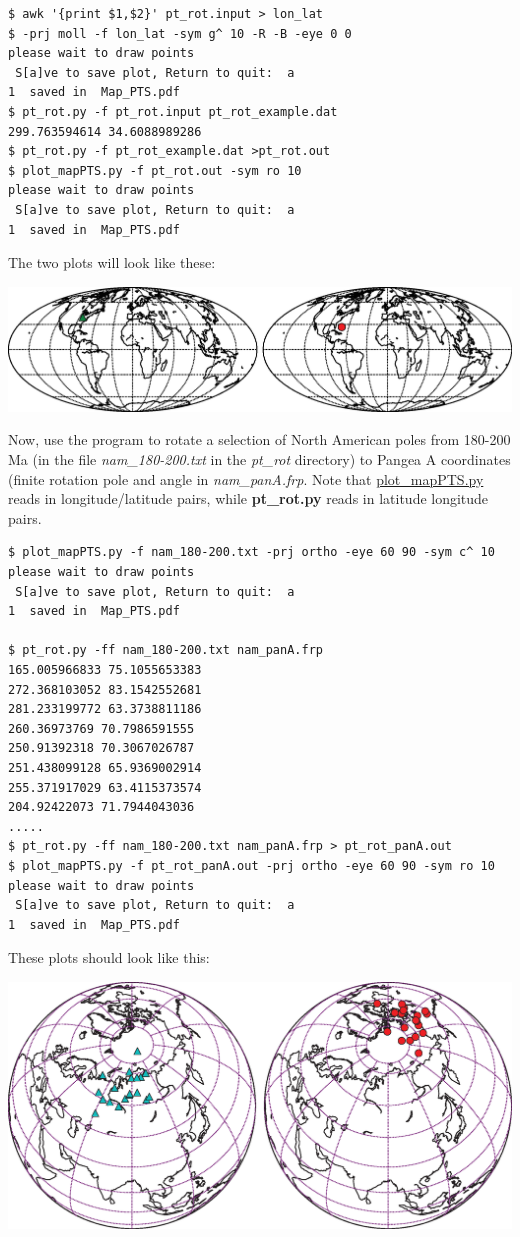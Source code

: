 \documentclass[11pt]{book}
\begin{document}
{{\begin{verbatim} 
$ awk '{print $1,$2}' pt_rot.input > lon_lat
$ -prj moll -f lon_lat -sym g^ 10 -R -B -eye 0 0
please wait to draw points
 S[a]ve to save plot, Return to quit:  a
1  saved in  Map_PTS.pdf
$ pt_rot.py -f pt_rot.input pt_rot_example.dat
299.763594614 34.6088989286
$ pt_rot.py -f pt_rot_example.dat >pt_rot.out
$ plot_mapPTS.py -f pt_rot.out -sym ro 10
please wait to draw points
 S[a]ve to save plot, Return to quit:  a
1  saved in  Map_PTS.pdf
\end{verbatim}

The two plots will look like these:

\includegraphics[width=15cm]{EPSfiles/pt_rot.eps}




Now, use the program to rotate a selection of North American poles from 180-200 Ma (in the file {\it nam\_180-200.txt} in the {\it pt\_rot} directory) to Pangea A coordinates (finite rotation pole and angle in {\it nam\_panA.frp}.   Note that \href{#plot_mapPTS.py}{plot\_mapPTS.py} reads in longitude/latitude pairs, while {\bf pt\_rot.py} reads in latitude longitude pairs.

\begin{verbatim}
$ plot_mapPTS.py -f nam_180-200.txt -prj ortho -eye 60 90 -sym c^ 10
please wait to draw points
 S[a]ve to save plot, Return to quit:  a
1  saved in  Map_PTS.pdf

$ pt_rot.py -ff nam_180-200.txt nam_panA.frp
165.005966833 75.1055653383
272.368103052 83.1542552681
281.233199772 63.3738811186
260.36973769 70.7986591555
250.91392318 70.3067026787
251.438099128 65.9369002914
255.371917029 63.4115373574
204.92422073 71.7944043036
.....
$ pt_rot.py -ff nam_180-200.txt nam_panA.frp > pt_rot_panA.out
$ plot_mapPTS.py -f pt_rot_panA.out -prj ortho -eye 60 90 -sym ro 10
please wait to draw points
 S[a]ve to save plot, Return to quit:  a
1  saved in  Map_PTS.pdf
\end{verbatim}

These plots should look like this:

\includegraphics[width=15cm]{EPSfiles/pt_rot_panA.eps}

}}
\end{document}

